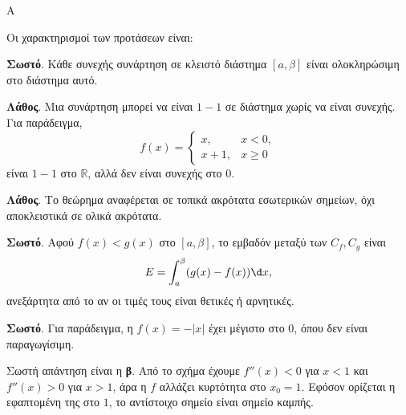 \begin{thema}{Α}
\begin{erwthma}
\item {}

\item {}

\item {}

\item Οι χαρακτηρισμοί των προτάσεων είναι:
\begin{alist}
\item \textbf{Σωστό}. Κάθε συνεχής συνάρτηση σε κλειστό διάστημα $[a,\beta]$ είναι ολοκληρώσιμη στο διάστημα αυτό.
\item \textbf{Λάθος}. Μια συνάρτηση μπορεί να είναι $1-1$ σε διάστημα χωρίς να είναι συνεχής. Για παράδειγμα,
\[
f(x)=
\begin{cases}
x, & x<0,\\
x+1, & x\geq0
\end{cases}
\]
είναι $1-1$ στο $\mathbb{R}$, αλλά δεν είναι συνεχής στο $0$.
\item \textbf{Λάθος}. Το θεώρημα  αναφέρεται σε τοπικά ακρότατα εσωτερικών σημείων, όχι αποκλειστικά σε ολικά ακρότατα.
\item \textbf{Σωστό}. Αφού $f(x)<g(x)$ στο $[a,\beta]$, το εμβαδόν μεταξύ των $C_f,C_g$ είναι
\[ E=\dint_a^\beta (g(x)-f(x))\d x, \]
ανεξάρτητα από το αν οι τιμές τους είναι θετικές ή αρνητικές.
\item \textbf{Σωστό}. Για παράδειγμα, η $f(x)=-|x|$ έχει μέγιστο στο $0$, όπου δεν είναι παραγωγίσιμη.
\end{alist}

\item Σωστή απάντηση είναι η \textbf{β}. Από το σχήμα έχουμε $f''(x)<0$ για $x<1$ και $f''(x)>0$ για $x>1$, άρα η $f$ αλλάζει κυρτότητα στο $x_0=1$. Εφόσον ορίζεται η εφαπτομένη της στο $1$, το αντίστοιχο σημείο είναι σημείο καμπής.
\end{erwthma}
\end{thema}

